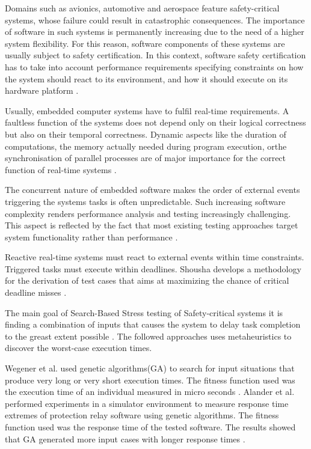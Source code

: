 Domains such as avionics, automotive and aerospace feature safety-critical systems, whose failure could result in catastrophic consequences.  The importance
of software in such systems is permanently increasing due to the need of a higher system
flexibility. For this reason, software components of these systems are usually subject to safety certification. In this context, software safety certification has to take into account performance requirements specifying constraints on how the system should react to its environment, and how it should execute on its hardware platform \cite{DiAlesio2013}.

Usually, embedded computer systems have to fulfil real-time requirements. A faultless function of the systems does not depend only on their logical correctness but also on their temporal correctness. Dynamic aspects like the duration of computations, the memory actually needed during program execution, orthe synchronisation of parallel processes are of major importance for the correct function of real-time systems  \cite{J.WegenerK.GrimmM.GrochtmannH.Sthamer1996} .

The concurrent nature of embedded software makes  the order of external events triggering the systems tasks is often unpredictable. Such increasing software complexity
renders performance analysis and testing increasingly
challenging. This aspect is reflected by the fact that most existing testing approaches target system functionality rather than performance \cite{DiAlesio2013}.

Reactive real-time systems must react to external events within time constraints. Triggered tasks must execute within deadlines. Shousha develops a methodology for the derivation of test cases that aims at maximizing the chance of critical deadline misses \cite{shousha2003performance}. 

The main goal of Search-Based Stress testing of Safety-critical systems it is finding a combination of inputs that causes the system to delay task completion to the greast extent possible \cite{shousha2003performance}. The followed approaches uses metaheuristics to discover the worst-case execution times. 

Wegener et al. \cite{Wegener1997} used genetic algorithms(GA) to search for input situations that produce very long or very short execution times. The fitness function used was the execution time of an individual measured in micro seconds \cite{Wegener1997}. Alander et al. \cite{Alander} performed experiments in a simulator environment to measure response time extremes of protection relay software using genetic algorithms. The fitness function used was the response time of the tested software. The results showed that GA generated more input cases with longer response times \cite{Alander}. 


